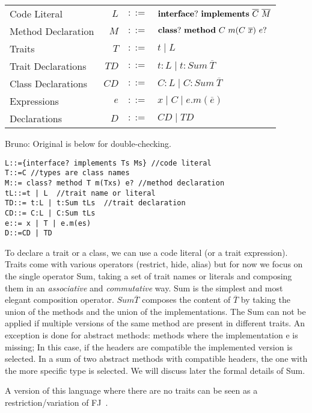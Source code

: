 \documentclass{llncs}
\newcommand{\mynotes}[3]{{\color{#2} {\sc #1}: #3}}
\newcommand\bruno[1]{\mynotes{Bruno}{red}{#1}}
\newcommand{\syndef}{$::=$}
\begin{document}
\begin{tabular}{lrcl}
      Code Literal & $L$ & \syndef & ${{\bf interface}?~{\bf implements}~\overline{C}~\overline{M}}$ \\
      Method Declaration & $M$ & \syndef & ${\bf class}?~{\bf method}~C~m(C~\overline{x})~e?$ \\

      Traits & $T$ & \syndef & $t \mid L$ \\
      Trait Declarations & $TD$ & \syndef & $t:L \mid t:Sum~\overline{T}$ \\
      Class Declarations & $CD$ & \syndef & $C:L \mid C:Sum~\overline{T}$ \\
      Expressions & $e$ & \syndef & $x \mid C \mid e.m(\overline{e})$\\
      Declarations & $D$ & \syndef & $CD \mid TD$\\
\end{tabular}

\bruno{Original is below for double-checking.}
\begin{verbatim}
L::={interface? implements Ts Ms} //code literal
T::=C //types are class names
M::= class? method T m(Txs) e? //method declaration
tL::=t | L  //trait name or literal
TD::= t:L | t:Sum tLs  //trait declaration
CD::= C:L | C:Sum tLs
e::= x | T | e.m(es)
D::=CD | TD
\end{verbatim}

To declare a trait or a class, we can use a code literal (or a trait
expression).  Traits come with various operators (restrict, hide,
alias) but for now we focus on the single operator Sum, taking a set
of trait names or literals and composing them in an \emph{associative}
and \emph{commutative} way.  Sum is the simplest and most elegant
composition operator.  $Sum \overline{T}$ composes the content of $\overline{T}$
by taking the union of the methods and the union of the implementations.
The Sum can not be applied if multiple versions of the same method are
present in different traits.  An exception is done for abstract methods:
methods where the implementation e is missing; In this case, if the
headers are compatible the implemented version is selected.  In a sum
of two abstract methods with compatible headers, the one with the more
specific type is selected. We will discuss later the formal details of
Sum.

A version of this language where there are no traits can be seen 
as a restriction/variation of FJ~\cite{}.
\end{document}
